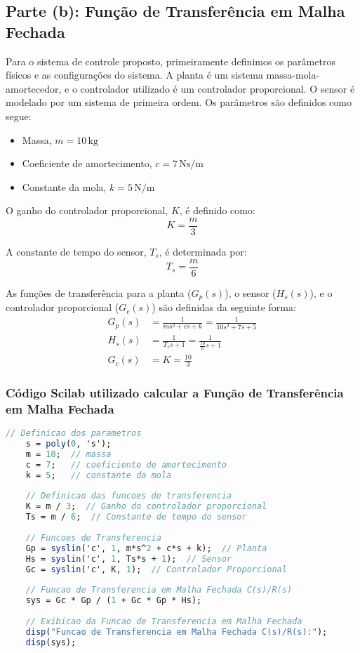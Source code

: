 \subsection{Parte (b): Função de Transferência em Malha Fechada}

Para o sistema de controle proposto, primeiramente definimos os parâmetros físicos e as configurações do sistema. A planta é um sistema massa-mola-amortecedor, e o controlador utilizado é um controlador proporcional. O sensor é modelado por um sistema de primeira ordem. Os parâmetros são definidos como segue:

\begin{itemize}
    \item Massa, \(m = 10\, \text{kg}\)
    \item Coeficiente de amortecimento, \(c = 7\, \text{Ns/m}\)
    \item Constante da mola, \(k = 5\, \text{N/m}\)
\end{itemize}

O ganho do controlador proporcional, \(K\), é definido como:
\[ K = \frac{m}{3} \]

A constante de tempo do sensor, \(T_s\), é determinada por:
\[ T_s = \frac{m}{6} \]

As funções de transferência para a planta (\(G_p(s)\)), o sensor (\(H_s(s)\)), e o controlador proporcional (\(G_c(s)\)) são definidas da seguinte forma:
\begin{align*}
    G_p(s) & = \frac{1}{m s^2 + c s + k} = \frac{1}{10 s^2 + 7 s + 5} \\
    H_s(s) & = \frac{1}{T_s s + 1} = \frac{1}{\frac{10}{6} s + 1}     \\
    G_c(s) & = K = \frac{10}{3}
\end{align*}

\subsubsection{Código Scilab utilizado calcular a Função de Transferência em Malha Fechada}
\begin{lstlisting}[language=Scilab, caption=Código Scilab para calcular a função de transferência em malha fechada]
    // Definicao dos parametros
    s = poly(0, 's');
    m = 10;  // massa
    c = 7;   // coeficiente de amortecimento
    k = 5;   // constante da mola
    
    // Definicao das funcoes de transferencia
    K = m / 3;  // Ganho do controlador proporcional
    Ts = m / 6;  // Constante de tempo do sensor
    
    // Funcoes de Transferencia
    Gp = syslin('c', 1, m*s^2 + c*s + k);  // Planta
    Hs = syslin('c', 1, Ts*s + 1);  // Sensor
    Gc = syslin('c', K, 1);  // Controlador Proporcional
    
    // Funcao de Transferencia em Malha Fechada C(s)/R(s)
    sys = Gc * Gp / (1 + Gc * Gp * Hs);
    
    // Exibicao da Funcao de Transferencia em Malha Fechada
    disp("Funcao de Transferencia em Malha Fechada C(s)/R(s):");
    disp(sys);
    \end{lstlisting}



